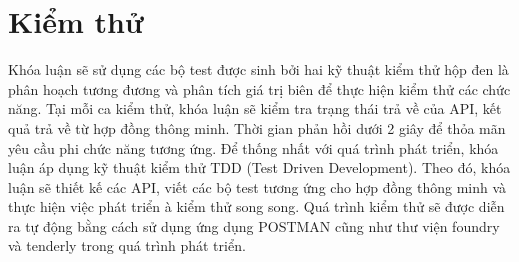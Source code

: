 \section{Kiểm thử}
Khóa luận sẽ sử dụng các bộ test được sinh bởi hai kỹ thuật kiểm thử hộp đen là
phân hoạch tương đương và phân tích giá trị biên để thực hiện kiểm thử các chức
năng. Tại mỗi ca kiểm thử, khóa luận sẽ kiểm tra trạng thái trả về của API, kết
quả trả về từ hợp đồng thông minh. Thời gian phản hồi dưới 2 giây để thỏa mãn yêu
cầu phi chức năng tương ứng. Để thống nhất với quá trình phát triển, khóa
luận áp dụng kỹ thuật kiểm thử TDD (Test Driven Development). Theo đó, khóa
luận sẽ thiết kế các API, viết các bộ test tương ứng cho hợp đồng thông minh và thực
hiện việc phát triển
à kiểm thử song song. Quá trình kiểm thử sẽ được diễn ra tự động bằng cách sử
dụng ứng dụng POSTMAN cũng như thư viện foundry và tenderly trong quá trình
phát triển.
\clearpage
